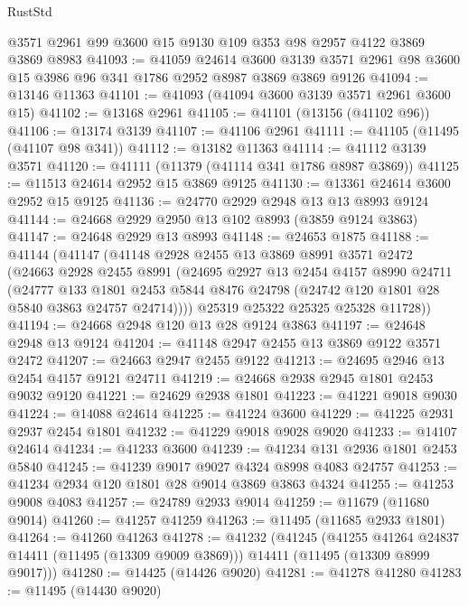 \begin{lexlean}{RustStd}
\begin{coremodule}
    @3571
    @2961
    @99
    @3600
    @15
    @9130
    @109
    @353
    @98
    @2957
    @4122
    @3869
    @3869
    @8983
@41093 := @41059
    @24614
    @3600
    @3139
    @3571
    @2961
    @98
    @3600
    @15
    @3986
    @96
    @341
    @1786
    @2952
    @8987
    @3869
    @3869
    @9126
@41094 := @13146 @11363
@41101 := @41093 (@41094 @3600 @3139 @3571 @2961 @3600 @15)
@41102 := @13168 @2961
@41105 := @41101 (@13156 (@41102 @96))
@41106 := @13174 @3139
@41107 := @41106 @2961
@41111 := @41105 (@11495 (@41107 @98 @341))
@41112 := @13182 @11363
@41114 := @41112 @3139 @3571
@41120 := @41111 (@11379 (@41114 @341 @1786 @8987 @3869))
@41125 := @11513 @24614 @2952 @15 @3869 @9125
@41130 := @13361 @24614 @3600 @2952 @15 @9125
@41136 := @24770 @2929 @2948 @13 @13 @8993 @9124
@41144 := @24668 @2929 @2950 @13 @102 @8993 (@3859 @9124 @3863)
@41147 := @24648 @2929 @13 @8993
@41148 := @24653 @1875
@41188 := @41144
    (@41147
      (@41148
        @2928
        @2455
        @13
        @3869
        @8991
        @3571
        @2472
        (@24663
          @2928
          @2455
          @8991
          (@24695
            @2927
            @13
            @2454
            @4157
            @8990
            @24711
            (@24777
              @133
              @1801
              @2453
              @5844
              @8476
              @24798
              (@24742 @120 @1801 @28 @5840 @3863 @24757 @24714))))
        @25319
        @25322
        @25325
        @25328
        @11728))
@41194 := @24668 @2948 @120 @13 @28 @9124 @3863
@41197 := @24648 @2948 @13 @9124
@41204 := @41148 @2947 @2455 @13 @3869 @9122 @3571 @2472
@41207 := @24663 @2947 @2455 @9122
@41213 := @24695 @2946 @13 @2454 @4157 @9121 @24711
@41219 := @24668 @2938 @2945 @1801 @2453 @9032 @9120
@41221 := @24629 @2938 @1801
@41223 := @41221 @9018 @9030
@41224 := @14088 @24614
@41225 := @41224 @3600
@41229 := @41225 @2931 @2937 @2454 @1801
@41232 := @41229 @9018 @9028 @9020
@41233 := @14107 @24614
@41234 := @41233 @3600
@41239 := @41234 @131 @2936 @1801 @2453 @5840
@41245 := @41239 @9017 @9027 @4324 @8998 @4083 @24757
@41253 := @41234 @2934 @120 @1801 @28 @9014 @3869 @3863 @4324
@41255 := @41253 @9008 @4083
@41257 := @24789 @2933 @9014
@41259 := @11679 (@11680 @9014)
@41260 := @41257 @41259
@41263 := @11495 (@11685 @2933 @1801)
@41264 := @41260 @41263
@41278 := @41232
    (@41245
      (@41255 @41264 @24837 @14411 (@11495 (@13309 @9009 @3869)))
      @14411
      (@11495 (@13309 @8999 @9017)))
@41280 := @14425 (@14426 @9020)
@41281 := @41278 @41280
@41283 := @11495 (@14430 @9020)

\end{coremodule}
\end{lexlean}
